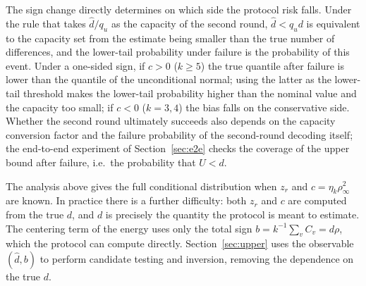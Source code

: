 The sign change directly determines on which side the protocol risk falls. Under the rule that takes
$\widehat d/q_u$ as the capacity of the second round, $\widehat d<q_u d$ is equivalent to the
capacity set from the estimate being smaller than the true number of differences, and the lower-tail
probability under failure is the probability of this event. Under a one-sided sign, if $c>0$
($k\ge5$) the true quantile after failure is lower than the quantile of the unconditional normal;
using the latter as the lower-tail threshold makes the lower-tail probability higher than the nominal
value and the capacity too small; if $c<0$ ($k=3,4$) the bias falls on the conservative side. Whether
the second round ultimately succeeds also depends on the capacity conversion factor and the failure
probability of the second-round decoding itself; the end-to-end experiment of Section~\ref{sec:e2e}
checks the coverage of the upper bound after failure, i.e.\ the probability that $U<d$.

The analysis above gives the full conditional distribution when $z_r$ and $c=\eta_k\rho_\infty^2$ are
known. In practice there is a further difficulty: both $z_r$ and $c$ are computed from the true $d$,
and $d$ is precisely the quantity the protocol is meant to estimate. The centering term of the energy
uses only the total sign $b=k^{-1}\sum_vC_v=d\rho$, which the protocol can compute directly.
Section~\ref{sec:upper} uses the observable $(\widehat d,b)$ to perform candidate testing and
inversion, removing the dependence on the true $d$.
